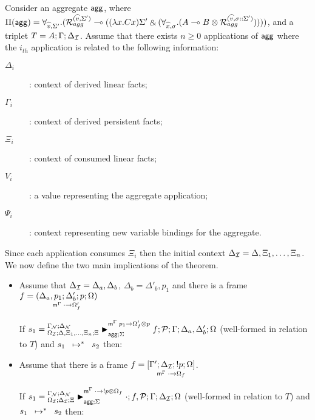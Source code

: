\begin{theorem}\label{thm:multiple_aggregate_derivation}
Consider an aggregate $\m{agg}$, where $\Pi(\m{agg}) = \forall_{\widehat{v}, \Sigma'}.
   (\defstwo{agg}{\widehat{v}}{\Sigma'} \lolli ((\lambda x. C x)\Sigma' \with (\forall_{\widehat{x}, \sigma}.
                                                (A \lolli B \otimes
                                                 \defstwo{agg}{\widehat{v}}{\sigma
                                                 ::\Sigma'}))))$,
and a triplet $T = A; \Gamma; \deltan$.
Assume that there exists $n \geq 0$ applications of $\m{agg}$
where the $i_{th}$ application is related to the following information:
\begin{description}
   \item[$\Delta_i$]: context of derived linear facts;
   \item[$\Gamma_i$]: context of derived persistent facts;
   \item[$\Xi_i$]: context of consumed linear facts;
   \item[$V_i$]: a value representing the aggregate application;
   \item[$\Psi_i$]: context representing new variable bindings for the aggregate.
\end{description}

Since each application consumes $\Xi_i$ then the initial context $\deltan =
\Delta, \Xi_1, \dotsc, \Xi_n$. We now define the two main implications of the
theorem.

\begin{itemize}[leftmargin=*]
   \item Assume that $\deltan = \Delta_a, \Delta_b$, $\Delta_b =
   \Delta'_b, p_1$ and there is a frame $f = \lframe{\Delta_a,
      p_1}{\Delta'_b}{p}{\Omega}{\cdot}{\Omega'_f}$

   If $s_1 = \matstatea{\Delta, \Xi_1, \dotsc, \Xi_n}{f; \lstack{P}}{\Gamma}{\Delta_a,
      \Delta'_b}{\Omega}{p_1 \rightarrow \Omega'_f \otimes p}{\Sigma}$
      (well-formed in relation to $T$) and $\transs{s_1}{s_2}$ then:

   

   \item Assume that there is a frame $f = \pframe{\Gamma'}{\deltan}{\bang
      p}{\Omega}{\cdot}{\Omega_f}$.
      
   If $s_1 = \matstatea{\deltan}{\cdot;
      f, \lstack{P}}{\Gamma}{\deltan}{\Omega}{\cdot \rightarrow \bang p \otimes \Omega_f}{\Sigma}$
      (well-formed in relation to $T$) and $\transs{s_1}{s_2}$ then:

   
\end{itemize}
   
\end{theorem}
